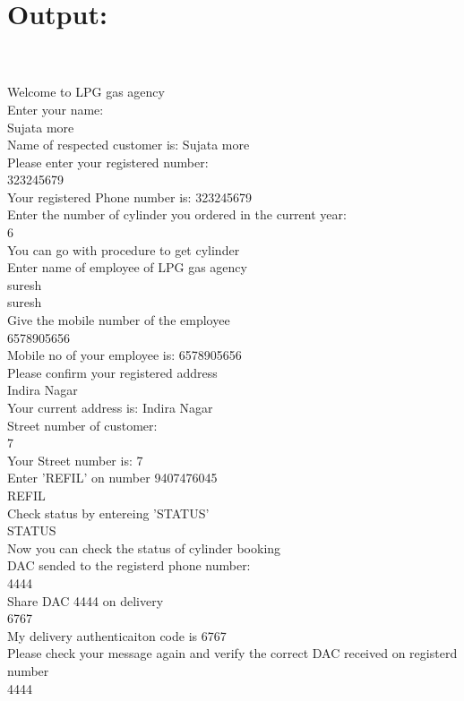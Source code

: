 \documentclass{article}
\begin{document}
{\section{Output:}
\\
\\
Welcome to LPG gas agency\\
Enter your name: \\
Sujata more\\
Name of respected customer is: Sujata more\\
Please enter your registered number: \\
323245679\\
Your registered Phone number is: 323245679\\
Enter the number of cylinder you ordered in the current year: \\
6\\
You can go with procedure to get cylinder\\
Enter name of employee of LPG gas agency\\
suresh\\
suresh\\
Give the mobile number of the employee\\
6578905656\\
Mobile no of your employee is: 6578905656\\
Please confirm your registered address\\
Indira Nagar\\
Your current address is: Indira Nagar\\
Street number of customer:\\ 
7\\
Your Street number is: 7\\
Enter 'REFIL' on number 9407476045\\
REFIL\\
Check status by entereing 'STATUS'\\
STATUS\\
Now you can check the status of cylinder booking\\
DAC sended to the registerd phone number: \\
4444\\
Share DAC 4444 on delivery\\
6767\\
My delivery authenticaiton code is 6767\\
Please check your message again and verify the correct DAC received on registerd number\\
4444\\
}
\end{document}
